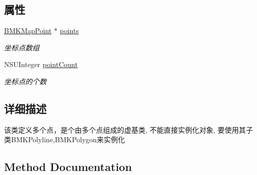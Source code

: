 \subsection*{属性}
\begin{DoxyCompactItemize}
\item 
\hypertarget{interface_b_m_k_multi_point_aa810056a59644284eb13fca968124e0c}{}\hyperlink{struct_b_m_k_map_point}{B\+M\+K\+Map\+Point} $\ast$ \hyperlink{interface_b_m_k_multi_point_aa810056a59644284eb13fca968124e0c}{points}\label{interface_b_m_k_multi_point_aa810056a59644284eb13fca968124e0c}

\begin{DoxyCompactList}\small\item\em 坐标点数组 \end{DoxyCompactList}\item 
\hypertarget{interface_b_m_k_multi_point_a717b76bf8c1c25ce7ae11c959fb4af9f}{}N\+S\+U\+Integer \hyperlink{interface_b_m_k_multi_point_a717b76bf8c1c25ce7ae11c959fb4af9f}{point\+Count}\label{interface_b_m_k_multi_point_a717b76bf8c1c25ce7ae11c959fb4af9f}

\begin{DoxyCompactList}\small\item\em 坐标点的个数 \end{DoxyCompactList}\end{DoxyCompactItemize}


\subsection{详细描述}
该类定义多个点，是个由多个点组成的虚基类, 不能直接实例化对象, 要使用其子类\+B\+M\+K\+Polyline,B\+M\+K\+Polygon来实例化 

\subsection{Method Documentation}
\hypertarget{interface_b_m_k_multi_point_a5d7b000029db5c7efb2230ccb980bc29}{}
